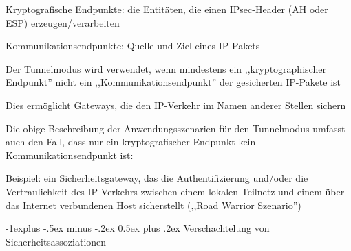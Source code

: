 \documentclass[a4paper]{article}
\makeatletter
\renewcommand{\subsection}{\@startsection{subsection}{2}{0mm}%
 {-1explus -.5ex minus -.2ex}%
 {0.5ex plus .2ex}%
 {\normalfont\normalsize\bfseries}}
\makeatother
\begin{document}
\begin{multicols}{3}
\begin{itemize*}
            \begin{itemize*}
                  \item Kryptografische Endpunkte: die Entitäten, die einen IPsec-Header (AH oder ESP) erzeugen/verarbeiten
                  \item Kommunikationsendpunkte: Quelle und Ziel eines IP-Pakets
            \end{itemize*}
            \item
            Der Tunnelmodus wird verwendet, wenn mindestens ein
            ,,kryptographischer Endpunkt'' nicht ein ,,Kommunikationsendpunkt''
            der gesicherten IP-Pakete ist

            \begin{itemize*}
                  \item Dies ermöglicht Gateways, die den IP-Verkehr im Namen anderer Stellen sichern
            \end{itemize*}
            \item
            Die obige Beschreibung der Anwendungsszenarien für den Tunnelmodus
            umfasst auch den Fall, dass nur ein kryptografischer Endpunkt kein
            Kommunikationsendpunkt ist:

            \begin{itemize*}
                  \item Beispiel: ein Sicherheitsgateway, das die Authentifizierung und/oder die Vertraulichkeit des IP-Verkehrs zwischen einem lokalen Teilnetz und einem über das Internet verbundenen Host sicherstellt (,,Road Warrior Szenario'')
            \end{itemize*}
      \end{itemize*}


      \subsection{Verschachtelung von
            Sicherheitsassoziationen}


\end{multicols}
\end{document}
